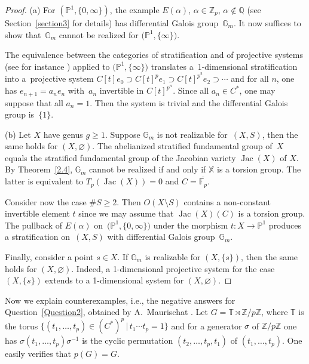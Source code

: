 \documentclass[10pt,a4paper]{amsart}
\numberwithin{equation}{section}
\begin{document}
\begin{proof} (a) For $(\mathbb{P}^1,\{0,\infty \})$, the example $E(\alpha)$, $\alpha \in \mathbb{Z}_p$, $\alpha \not \in \mathbb{Q}$ (see Section~\ref{section3} for details) has differential Galois group~$\mathbb{G}_m$. It now suffices to show that~$\mathbb{G}_m$ cannot be realized for $\big(\mathbb{P}^1,\{\infty \}\big)$.

The equivalence between the categories of stratification and of projective systems (see for instance \cite[Theorem~8]{Sa}) applied to $\big(\mathbb{P}^1,\{\infty \}\big)$ translates a~1-dimensional stratification into a~projective system $C[t]e_0\supset C[t]^pe_1\supset C[t]^{p^2}e_2\supset \cdots$ and for all $n$, one has $e_{n+1}=a_n e_n$ with~$a_n$ invertible in $C[t]^{p^n}$. Since all $a_n\in C^*$, one may suppose that all $a_n=1$. Then the system is trivial and the differential Galois group is~$\{1\}$.

(b) Let $X$ have genus $g\geq 1$. Suppose $\mathbb{G}_m$ is not realizable for~$(X,S)$, then the same holds for $(X,\varnothing)$. The abelianized stratified fundamental group of~$X$ equals the stratified fundamental group of the Jacobian variety $\operatorname{Jac}(X)$ of $X$. By Theorem~\ref{2.4}, $\mathbb{G}_m$ cannot be realized if and only if $\mathbb{X}$ is a torsion group. The latter is equivalent to $T_p(\operatorname{Jac}(X))=0$ and $C=\overline{\mathbb{F}_p}$.

Consider now the case $\#S\geq 2$. Then $O(X\setminus S)$ contains a non-constant invertible element $t$ since we may assume that $\operatorname{Jac}(X)(C)$ is a torsion group. The pullback of $E(\alpha )$ on~$\big(\mathbb{P}^1,\{0,\infty \}\big)$ under the morphism $t\colon X\rightarrow \mathbb{P}^1$ produces a stratification on~$(X,S)$ with differential Galois group~$\mathbb{G}_m$.

Finally, consider a point $s\in X$. If $\mathbb{G}_m$ is realizable for $(X,\{s\})$, then the same holds for $(X,\varnothing)$. Indeed, a 1-dimensional projective system for the case $(X,\{s\})$ extends to a 1-dimen\-sional system for $(X,\varnothing)$. \end{proof}

Now we explain counterexamples, i.e., the negative answers for Question~\ref{Question2}, obtained by A.~Maurischat \cite[Theorem~9.1]{R}.
Let $G=\mathbb{T}\rtimes \mathbb{Z}/p\mathbb{Z}$, where $\mathbb{T}$ is the torus $\{(t_1,\dots,t_p)\in (C^*)^p\, | \, t_1\cdots t_p=1\}$ and for a generator $\sigma$ of $\mathbb{Z}/p\mathbb{Z}$ one has $\sigma (t_1,\dots ,t_p)\sigma^{-1}$ is the cyclic permutation $(t_2,\dots ,t_p,t_1)$ of $(t_1,\dots ,t_p)$. One easily verifies that $p(G)=G$.
\end{document}
